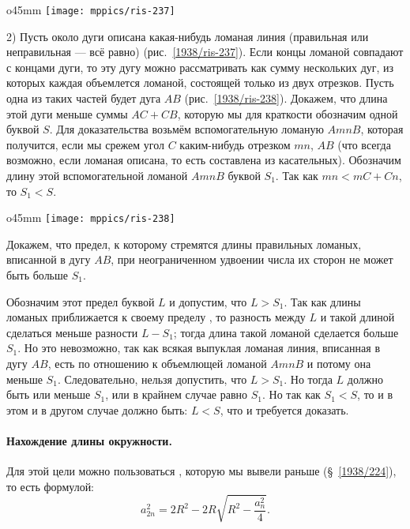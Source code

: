 \begin{wrapfigure}[6]{o}{45mm}
\vskip-3mm
\centering
\texttt{[image: mppics/ris-237]}
\caption{}\label{1938/ris-237}
\end{wrapfigure}

2) Пусть около дуги описана какая-нибудь ломаная линия (правильная или неправильная — всё равно) (рис.~\ref{1938/ris-237}).
Если концы ломаной совпадают с концами дуги, то эту дугу можно рассматривать как сумму нескольких дуг, из которых каждая объемлется ломаной, состоящей только из двух отрезков.
Пусть одна из таких частей будет дуга $AB$ (рис.~\ref{1938/ris-238}).
Докажем, что длина этой дуги меньше суммы $AC+CB$, которую мы для краткости обозначим одной буквой $S$.
Для доказательства возьмём вспомогательную ломаную $AmnB$, которая получится, если мы срежем угол $C$ каким-нибудь отрезком $mn$,  $AB$ (что всегда возможно, если ломаная описана, то есть составлена из касательных).
Обозначим длину этой вспомогательной ломаной $AmnB$ буквой $S_1$.
Так как $mn<mC+Cn$, то $S_1<S$.

\begin{wrapfigure}{o}{45mm}
\centering
\texttt{[image: mppics/ris-238]}
\caption{}\label{1938/ris-238}
\end{wrapfigure}

Докажем, что предел, к которому стремятся длины правильных ломаных, вписанной в дугу $AB$, при неограниченном удвоении числа их сторон не может быть больше $S_1$.

Обозначим этот предел буквой $L$ и допустим, что $L>S_1$.
Так как длины ломаных приближается к своему пределу , то разность между $L$ и такой длиной сделаться меньше разности $L-S_1$; тогда длина такой ломаной сделается больше $S_1$.
Но это невозможно, так как всякая выпуклая ломаная линия, вписанная в дугу $AB$, есть  по отношению к объемлющей ломаной $AmnB$ и потому она меньше $S_1$.
Следовательно, нельзя допустить, что $L>S_1$.
Но тогда $L$ должно быть или меньше $S_1$, или в крайнем случае равно $S_1$.
Но так как $S_1<S$, то и в этом и в другом случае должно быть:
$L<S$, что и требуется доказать.

\paragraph{Нахождение длины окружности.}\label{1938/237}
Для этой цели можно пользоваться , которую мы вывели раньше (§~\ref{1938/224}), то есть формулой:
\[a_{2n}^2=2R^2-2R\sqrt{R^2-\frac{a_n^2}4}.\]

